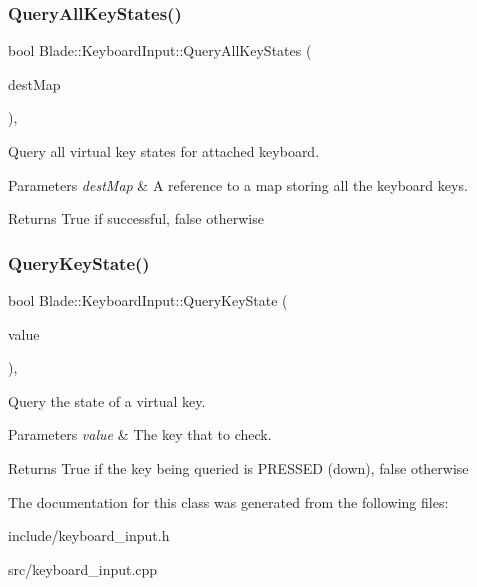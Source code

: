 \subsubsection{\texorpdfstring{Query\+All\+Key\+States()}{QueryAllKeyStates()}}
{\footnotesize\ttfamily bool Blade\+::\+Keyboard\+Input\+::\+Query\+All\+Key\+States (\begin{DoxyParamCaption}\item[{std\+::map$<$ \hyperlink{namespace_blade_a15d9bde4921fb2a9a953f8d97ea49d1c}{Virtual\+Key}, bool $>$ \&}]{dest\+Map }\end{DoxyParamCaption})\hspace{0.3cm}{\ttfamily [static]}, {\ttfamily [noexcept]}}



Query all virtual key states for attached keyboard. 


\begin{DoxyParams}{Parameters}
{\em dest\+Map} & A reference to a map storing all the keyboard keys. \\
\hline
\end{DoxyParams}
\begin{DoxyReturn}{Returns}
True if successful, false otherwise 
\end{DoxyReturn}
\mbox{\label{class_blade_1_1_keyboard_input_a9430c44501f4c2a4c3550be2b4bc05d0}} 
\subsubsection{\texorpdfstring{Query\+Key\+State()}{QueryKeyState()}}
{\footnotesize\ttfamily bool Blade\+::\+Keyboard\+Input\+::\+Query\+Key\+State (\begin{DoxyParamCaption}\item[{\hyperlink{namespace_blade_a15d9bde4921fb2a9a953f8d97ea49d1c}{Virtual\+Key}}]{value }\end{DoxyParamCaption})\hspace{0.3cm}{\ttfamily [static]}, {\ttfamily [noexcept]}}



Query the state of a virtual key. 


\begin{DoxyParams}{Parameters}
{\em value} & The key that to check. \\
\hline
\end{DoxyParams}
\begin{DoxyReturn}{Returns}
True if the key being queried is P\+R\+E\+S\+S\+ED (down), false otherwise 
\end{DoxyReturn}


The documentation for this class was generated from the following files\+:\begin{DoxyCompactItemize}
\item 
include/keyboard\+\_\+input.\+h\item 
src/keyboard\+\_\+input.\+cpp\end{DoxyCompactItemize}
